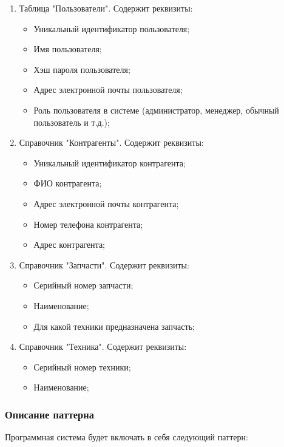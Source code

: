 \begin{enumerate}
	\item Таблица "Пользователи".
	Содержит реквизиты:
	\begin{itemize}
		\item Уникальный идентификатор пользователя;
		\item Имя пользователя;
		\item Хэш пароля пользователя;
		\item Адрес электронной почты пользователя;
		\item Роль пользователя в системе (администратор, менеджер, обычный пользователь и т.д.);
	\end{itemize}
	
	\item Справочник "Контрагенты".
	Содержит реквизиты: 
	\begin{itemize}
		\item Уникальный идентификатор контрагента;
		\item ФИО контрагента;
		\item Адрес электронной почты контрагента;
		\item Номер телефона контрагента;
		\item Адрес контрагента;
	\end{itemize}
	
	\item Справочник "Запчасти".
	Содержит реквизиты: 
	\begin{itemize}
		\item Серийный номер запчасти;
		\item Наименование;
		\item Для какой техники предназначена запчасть;
	\end{itemize}
	
	\item Справочник "Техника".
	Содержит реквизиты: 
	\begin{itemize}
		\item Серийный номер техники;
		\item Наименование;
	\end{itemize}
\end{enumerate}

\subsubsection{Описание паттерна}

Программная система будет включать в себя следующий паттерн:

